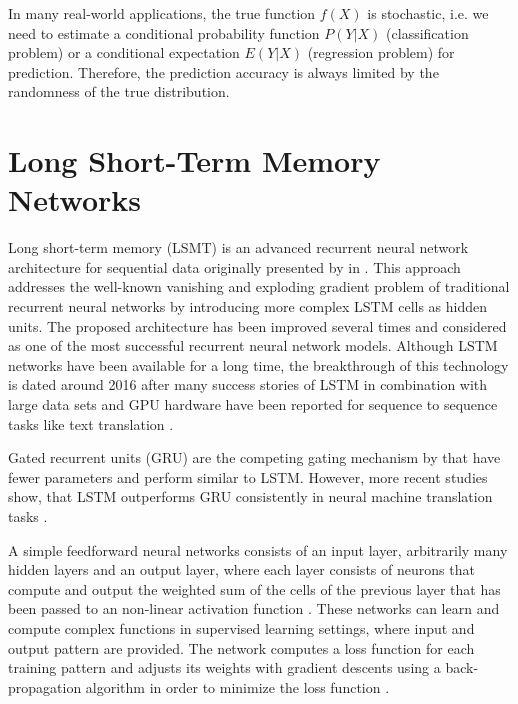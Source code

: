 In many real-world applications, the true function $f(X)$ is stochastic, i.e. we need to estimate a conditional probability function $P(Y | X)$ (classification problem) or a conditional expectation $E(Y | X)$ (regression problem) for prediction.
Therefore, the prediction accuracy is always limited by the randomness of the true distribution.




\section{Long Short-Term Memory Networks}

Long short-term memory (LSMT) is an advanced recurrent neural network architecture for sequential data originally presented by \citeauthor{DBLP:journals/neco/HochreiterS97} in \citeyear{DBLP:journals/neco/HochreiterS97}  \cite{DBLP:journals/neco/HochreiterS97}.
This approach addresses the well-known vanishing and exploding gradient problem \cite{DBLP:conf/icml/PascanuMB13}  of traditional recurrent neural networks by introducing more complex LSTM cells as hidden units.
The proposed architecture has been improved several times \cite{DBLP:journals/neco/GersSC00} \cite {DBLP:journals/tnn/GreffSKSS17} and considered as one of the most successful recurrent neural network models.
Although LSTM networks have been available for a long time, the breakthrough of this technology is dated around 2016 after many success stories of LSTM in combination with large data sets and GPU hardware have been reported for sequence to sequence tasks like text translation \cite{DBLP:journals/corr/WuSCLNMKCGMKSJL16}.

Gated recurrent units (GRU) \cite{DBLP:conf/emnlp/ChoMGBBSB14} are the competing gating mechanism by \citeauthor{DBLP:conf/emnlp/ChoMGBBSB14} that have fewer parameters and perform similar to LSTM.
However, more recent studies show, that LSTM outperforms GRU consistently in neural machine translation tasks \cite{DBLP:journals/corr/BritzGLL17}.

A simple feedforward neural networks consists of an input layer, arbitrarily many hidden layers and an output layer, where each layer consists of neurons that compute and output the weighted sum of the cells of the previous layer that has been passed to an non-linear activation function \cite{DBLP:journals/nn/Schmidhuber15}.
These networks can learn and compute complex functions in supervised learning settings, where input and output pattern are provided.
The network computes a loss function for each training pattern and adjusts its weights with gradient descents using a back-propagation algorithm in order to minimize the loss function \cite{rumelhart1986learning}.

